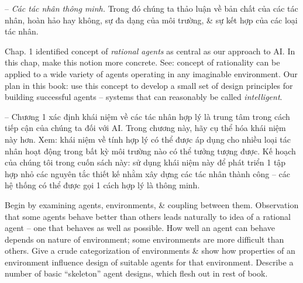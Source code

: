 \documentclass{article}
\begin{document}
\begin{itemize}
\begin{itemize}
		-- {\it Các tác nhân thông minh.} Trong đó chúng ta thảo luận về bản chất của các tác nhân, hoàn hảo hay không, sự đa dạng của môi trường, \& sự kết hợp của các loại tác nhân.
		
		Chap. 1 identified concept of {\it rational agents} as central as our approach to AI. In this chap, make this notion more concrete. See: concept of rationality can be applied to a wide variety of agents operating in any imaginable environment. Our plan in this book: use this concept to develop a small set of design principles for building successful agents -- systems that can reasonably be called {\it intelligent}.
		
		-- Chương 1 xác định khái niệm về các tác nhân hợp lý là trung tâm trong cách tiếp cận của chúng ta đối với AI. Trong chương này, hãy cụ thể hóa khái niệm này hơn. Xem: khái niệm về tính hợp lý có thể được áp dụng cho nhiều loại tác nhân hoạt động trong bất kỳ môi trường nào có thể tưởng tượng được. Kế hoạch của chúng tôi trong cuốn sách này: sử dụng khái niệm này để phát triển 1 tập hợp nhỏ các nguyên tắc thiết kế nhằm xây dựng các tác nhân thành công -- các hệ thống có thể được gọi 1 cách hợp lý là thông minh.
		
		Begin by examining agents, environments, \& coupling between them. Observation that some agents behave better than others leads naturally to idea of a rational agent -- one that behaves as well as possible. How well an agent can behave depends on nature of environment; some environments are more difficult than others. Give a crude categorization of environments \& show how properties of an environment influence design of suitable agents for that environment. Describe a number of basic ``skeleton'' agent designs, which flesh out in rest of book.
		

\end{itemize}
\end{itemize}
\end{document}
